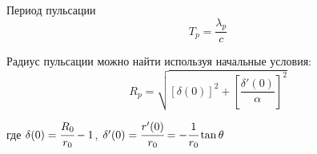 Период пульсации 
\[ T_p = \frac{\lambda_p}{c} \]

Радиус пульсации можно найти используя начальные условия:
\[
	R_p = \sqrt{ [\delta(0)]^2 + 
		\left[ \frac{\delta'(0)}{\alpha} \right]^2 }
\]

где \( \delta(0) = \cfrac{R_0}{r_0} - 1 \), 
\( \delta'(0) = \cfrac{r'(0)}{r_0} = -\cfrac{1}{r_0}\tan\theta \)

\begin{figure}[h]
	\begin{minipage}[h]{0.5\linewidth}
	\end{minipage}
	\begin{minipage}[h]{0.5\linewidth}
	\end{minipage}
\end{figure}



